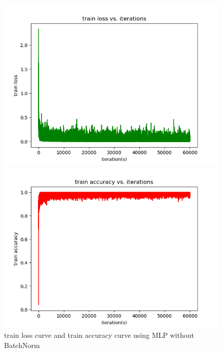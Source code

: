 \documentclass{elegantbook}
\begin{document}
\begin{figure}[!h]
	\centering
	\begin{minipage}[t]{0.48\textwidth}
		\centering
		\includegraphics[width=\textwidth]{../results/trainloss12}
	\end{minipage}
	\begin{minipage}[t]{0.48\textwidth}
		\centering
		\includegraphics[width=\textwidth]{../results/trainacc12}
	\end{minipage}
	\caption{\label{trainres12}train loss curve and train accuracy curve using MLP without BatchNorm}
\end{figure}
\end{document}
